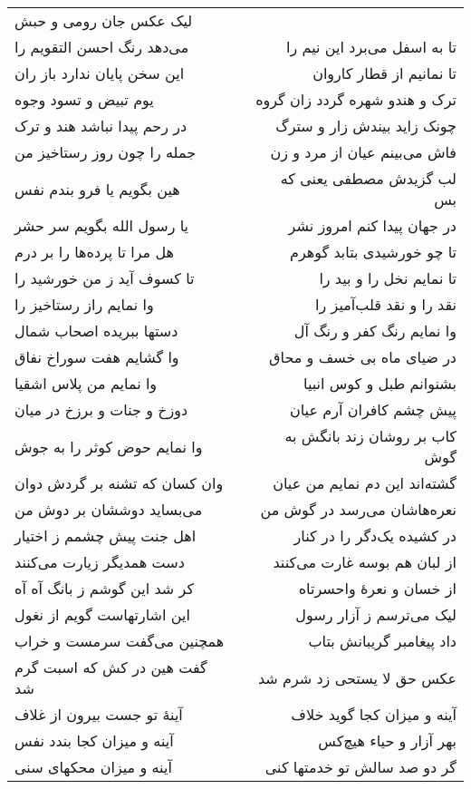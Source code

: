 \begin{center}
\begin{longtable}{l p{0.5cm} r}
لیک عکس جان رومی و حبش
\\
می‌دهد رنگ احسن التقویم را
&&
تا به اسفل می‌برد این نیم را
\\
این سخن پایان ندارد باز ران
&&
تا نمانیم از قطار کاروان
\\
یوم تبیض و تسود وجوه
&&
ترک و هندو شهره گردد زان گروه
\\
در رحم پیدا نباشد هند و ترک
&&
چونک زاید بیندش زار و سترگ
\\
جمله را چون روز رستاخیز من
&&
فاش می‌بینم عیان از مرد و زن
\\
هین بگویم یا فرو بندم نفس
&&
لب گزیدش مصطفی یعنی که بس
\\
یا رسول الله بگویم سر حشر
&&
در جهان پیدا کنم امروز نشر
\\
هل مرا تا پرده‌ها را بر درم
&&
تا چو خورشیدی بتابد گوهرم
\\
تا کسوف آید ز من خورشید را
&&
تا نمایم نخل را و بید را
\\
وا نمایم راز رستاخیز را
&&
نقد را و نقد قلب‌آمیز را
\\
دستها ببریده اصحاب شمال
&&
وا نمایم رنگ کفر و رنگ آل
\\
وا گشایم هفت سوراخ نفاق
&&
در ضیای ماه بی خسف و محاق
\\
وا نمایم من پلاس اشقیا
&&
بشنوانم طبل و کوس انبیا
\\
دوزخ و جنات و برزخ در میان
&&
پیش چشم کافران آرم عیان
\\
وا نمایم حوض کوثر را به جوش
&&
کاب بر روشان زند بانگش به گوش
\\
وان کسان که تشنه بر گردش دوان
&&
گشته‌اند این دم نمایم من عیان
\\
می‌بساید دوششان بر دوش من
&&
نعره‌هاشان می‌رسد در گوش من
\\
اهل جنت پیش چشمم ز اختیار
&&
در کشیده یک‌دگر را در کنار
\\
دست همدیگر زیارت می‌کنند
&&
از لبان هم بوسه غارت می‌کنند
\\
کر شد این گوشم ز بانگ آه آه
&&
از خسان و نعرهٔ واحسرتاه
\\
این اشارتهاست گویم از نغول
&&
لیک می‌ترسم ز آزار رسول
\\
همچنین می‌گفت سرمست و خراب
&&
داد پیغامبر گریبانش بتاب
\\
گفت هین در کش که اسبت گرم شد
&&
عکس حق لا یستحی زد شرم شد
\\
آینهٔ تو جست بیرون از غلاف
&&
آینه و میزان کجا گوید خلاف
\\
آینه و میزان کجا بندد نفس
&&
بهر آزار و حیاء هیچ‌کس
\\
آینه و میزان محکهای سنی
&&
گر دو صد سالش تو خدمتها کنی
\\

\end{longtable}
\end{center}
